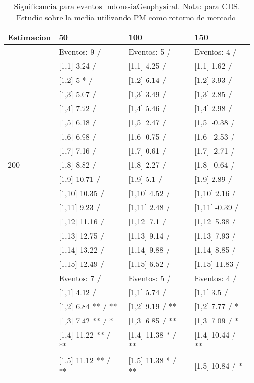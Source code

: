 \begin{table}

\caption{Significancia para eventos IndonesiaGeophysical. Nota: para CDS. Estudio sobre la media utilizando PM como retorno de mercado.}
\centering
\begin{tabular}[t]{llll}
\toprule
Estimacion & 50 & 100 & 150\\
\midrule
 & Eventos:  9 / & Eventos:  5 / & Eventos:  4 /\\
 & {}[1,1] 3.24  / & {}[1,1] 4.25  / & {}[1,1] 1.62  /\\
 & {}[1,2] 5 * / & {}[1,2] 6.14  / & {}[1,2] 3.93  /\\
 & {}[1,3] 5.07  / & {}[1,3] 3.49  / & {}[1,3] 2.85  /\\
 & {}[1,4] 7.22  / & {}[1,4] 5.46  / & {}[1,4] 2.98  /\\
\addlinespace
 & {}[1,5] 6.18  / & {}[1,5] 2.47  / & {}[1,5] -0.38  /\\
 & {}[1,6] 6.98  / & {}[1,6] 0.75  / & {}[1,6] -2.53  /\\
 & {}[1,7] 7.16  / & {}[1,7] 0.61  / & {}[1,7] -2.71  /\\
200 & {}[1,8] 8.82  / & {}[1,8] 2.27  / & {}[1,8] -0.64  /\\
 & {}[1,9] 10.71  / & {}[1,9] 5.1  / & {}[1,9] 2.89  /\\
\addlinespace
 & {}[1,10] 10.35  / & {}[1,10] 4.52  / & {}[1,10] 2.16  /\\
 & {}[1,11] 9.23  / & {}[1,11] 2.48  / & {}[1,11] -0.39  /\\
 & {}[1,12] 11.16  / & {}[1,12] 7.1  / & {}[1,12] 5.38  /\\
 & {}[1,13] 12.75  / & {}[1,13] 9.14  / & {}[1,13] 7.93  /\\
 & {}[1,14] 13.22  / & {}[1,14] 9.88  / & {}[1,14] 8.85  /\\
\addlinespace
 & {}[1,15] 12.49  / & {}[1,15] 6.52  / & {}[1,15] 11.83  /\\
 & Eventos:  7 / & Eventos:  5 / & Eventos:  4 /\\
 & {}[1,1] 4.12  / & {}[1,1] 5.74  / & {}[1,1] 3.5  /\\
 & {}[1,2] 6.84 ** / ** & {}[1,2] 9.19  / ** & {}[1,2] 7.77  / *\\
 & {}[1,3] 7.42 ** / * & {}[1,3] 6.85  / ** & {}[1,3] 7.09  / *\\
\addlinespace
 & {}[1,4] 11.22 ** / ** & {}[1,4] 11.38 * / ** & {}[1,4] 10.44  / **\\
 & {}[1,5] 11.12 ** / ** & {}[1,5] 11.38 * / ** & {}[1,5] 10.84  / *\\

\end{tabular}
\end{table}
